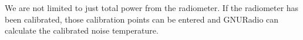 We are not limited to just total power from the radiometer.  If the radiometer has been calibrated, those calibration points can be entered and GNURadio can calculate the calibrated noise temperature.  



